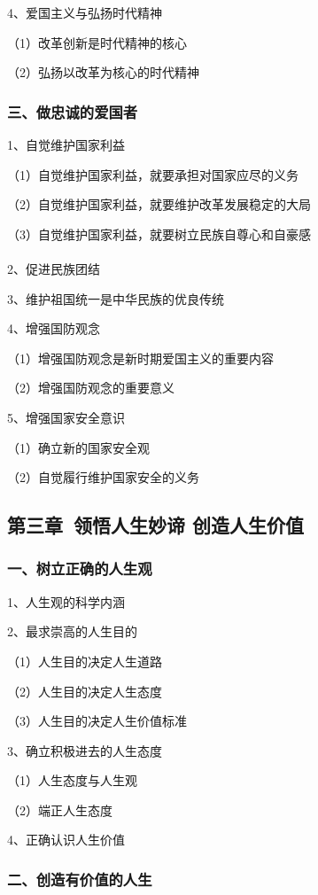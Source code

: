 \documentclass{ctexart}
\begin{document}
4、爱国主义与弘扬时代精神

（1）改革创新是时代精神的核心

（2）弘扬以改革为核心的时代精神

\subsubsection{三、做忠诚的爱国者}

1、自觉维护国家利益

（1）自觉维护国家利益，就要承担对国家应尽的义务

（2）自觉维护国家利益，就要维护改革发展稳定的大局

（3）自觉维护国家利益，就要树立民族自尊心和自豪感
\\\\

2、促进民族团结

3、维护祖国统一是中华民族的优良传统

4、增强国防观念

（1）增强国防观念是新时期爱国主义的重要内容

（2）增强国防观念的重要意义

5、增强国家安全意识

（1）确立新的国家安全观

（2）自觉履行维护国家安全的义务

\subsection{第三章\ 领悟人生妙谛 创造人生价值}

\subsubsection{一、树立正确的人生观}

1、人生观的科学内涵

2、最求崇高的人生目的

（1）人生目的决定人生道路

（2）人生目的决定人生态度

（3）人生目的决定人生价值标准

3、确立积极进去的人生态度

（1）人生态度与人生观

（2）端正人生态度

4、正确认识人生价值

\subsubsection{二、创造有价值的人生}
\end{document}
